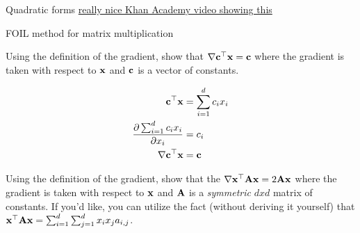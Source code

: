 \documentclass[assignment01_Solutions]{subfiles}
\begin{document}
\begin{exercise}[30 minutes]
\bes
\item Quadratic forms \href{https://www.khanacademy.org/math/multivariable-calculus/applications-of-multivariable-derivatives/quadratic-approximations/v/expressing-a-quadratic-form-with-a-matrix}{really nice Khan Academy video showing this}
\item FOIL method for matrix multiplication

\item Using the definition of the gradient, show that $\nabla \mathbf{c}^\top \mathbf{x} = \mathbf{c}$ where the gradient is taken with respect to $\mathbf{x}$ and $\mathbf{c}$ is a vector of constants.


\begin{boxedsolution}

\begin{align}
\mathbf{c}^\top \mathbf{x} &= \sum_{i=1}^d c_i x_i \\
\frac{\partial  \sum_{i=1}^d c_i x_i }{\partial x_i} &= c_i  \\
\nabla \mathbf{c}^\top \mathbf{x} &= \mathbf{c}
\end{align}

\end{boxedsolution}

\fi


\item Using the definition of the gradient, show that the $\nabla \mathbf{x}^\top \mathbf{A} \mathbf{x} = 2 \mathbf{A} \mathbf{x}$ where the gradient is taken with respect to $\mathbf{x}$ and $\mathbf{A}$ is a \emph{symmetric} $dxd$ matrix of constants.  If you'd like, you can utilize the fact (without deriving it yourself) that $\mathbf{x}^\top \mathbf{A} \mathbf{x} = \sum_{i=1}^d\sum_{j=1}^d x_i x_j a_{i, j}$.%
\ees

\begin{boxedsolution}


\end{boxedsolution}
\end{exercise}
\end{document}
